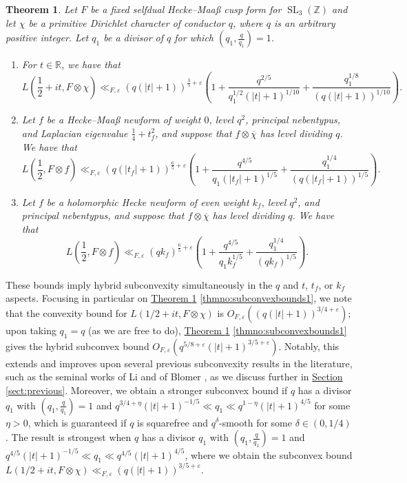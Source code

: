 \documentclass[11pt,a4paper]{amsart}
\newcommand{\e}{\varepsilon}
\newcommand{\R}{\mathbb{R}}
\newcommand{\Z}{\mathbb{Z}}
\DeclareMathOperator{\SL}{SL}
\numberwithin{equation}{section}
\newtheorem{theorem}[equation]{Theorem}
\theoremstyle{remark}
\theoremstyle{definition}
\begin{document}
\begin{theorem}
\label{thm:subconvexbounds}
Let $F$ be a fixed selfdual Hecke--Maa\ss{} cusp form for $\SL_3(\Z)$ and let $\chi$ be a primitive Dirichlet character of conductor $q$, where $q$ is an arbitrary positive integer. Let $q_1$ be a divisor of $q$ for which $(q_1,\frac{q}{q_1}) = 1$.
\begin{enumerate}[leftmargin=*,label=\textup{(\arabic*)}]
\item\label{thmno:subconvexbounds1} For $t \in \R$, we have that
\[L\left(\frac{1}{2} + it, F \otimes \chi\right) \ll_{F,\e} (q(|t| + 1))^{\frac{3}{5} + \e} \left(1 + \frac{q^{2/5}}{q_1^{1/2} (|t| + 1)^{1/10}} + \frac{q_1^{1/8}}{(q(|t| + 1))^{1/10}}\right).\]
\item\label{thmno:subconvexbounds2} Let $f$ be a Hecke--Maa\ss{} newform of weight $0$, level $q^2$, principal nebentypus, and Laplacian eigenvalue $\frac{1}{4} + t_f^2$, and suppose that $f \otimes \overline{\chi}$ has level dividing $q$. We have that
\[L\left(\frac{1}{2},F \otimes f\right) \ll_{F,\e} (q(|t_f| + 1))^{\frac{6}{5} + \e} \left(1 + \frac{q^{4/5}}{q_1 (|t_f| + 1)^{1/5}} + \frac{q_1^{1/4}}{(q(|t_f| + 1))^{1/5}}\right).\]
\item\label{thmno:subconvexbounds3} Let $f$ be a holomorphic Hecke newform of even weight $k_f$, level $q^2$, and principal nebentypus, and suppose that $f \otimes \overline{\chi}$ has level dividing $q$. We have that
\[L\left(\frac{1}{2},F \otimes f\right) \ll_{F,\e} (q k_f)^{\frac{6}{5} + \e} \left(1 + \frac{q^{4/5}}{q_1 k_f^{1/5}} + \frac{q_1^{1/4}}{(q k_f)^{1/5}}\right).\]
\end{enumerate}
\end{theorem}

These bounds imply hybrid subconvexity simultaneously in the $q$ and $t$, $t_f$, or $k_f$ aspects. Focusing in particular on \hyperref[thm:subconvexbounds]{Theorem \ref*{thm:subconvexbounds}} \ref{thmno:subconvexbounds1}, we note that the convexity bound for $L(1/2 + it,F \otimes \chi)$ is $O_{F,\e}((q(|t| + 1))^{3/4 + \e})$; upon taking $q_1 = q$ (as we are free to do), \hyperref[thm:subconvexbounds]{Theorem \ref*{thm:subconvexbounds}} \ref{thmno:subconvexbounds1} gives the hybrid subconvex bound $O_{F,\e}(q^{5/8 + \e} (|t| + 1)^{3/5 + \e})$. Notably, this extends and improves upon several previous subconvexity results in the literature, such as the seminal works of Li \cite{Li11} and of Blomer \cite{Blo12}, as we discuss further in \hyperref[sect:previous]{Section \ref*{sect:previous}}. Moreover, we obtain a stronger subconvex bound if $q$ has a divisor $q_1$ with $(q_1,\frac{q}{q_1}) = 1$ and $q^{3/4 + \eta} (|t| + 1)^{-1/5} \ll q_1 \ll q^{1 - \eta} (|t| + 1)^{4/5}$ for some $\eta > 0$, which is guaranteed if $q$ is squarefree and $q^{\delta}$-smooth for some $\delta \in (0,1/4)$. The result is strongest when $q$ has a divisor $q_1$ with $(q_1,\frac{q}{q_1}) = 1$ and $q^{4/5} (|t| + 1)^{-1/5} \ll q_1 \ll q^{4/5} (|t| + 1)^{4/5}$, where we obtain the subconvex bound $L(1/2 + it,F \otimes \chi) \ll_{F,\e} (q(|t| + 1))^{3/5 + \e}$.
\end{document}
